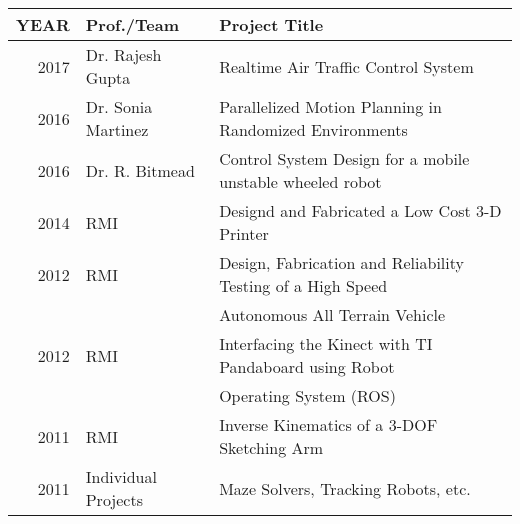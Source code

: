 \documentclass[]{deedy-resume-openfont}
\begin{document}
\begin{minipage}[t]{0.66\textwidth}
\begin{tabular}{rll}
YEAR	     & Prof./Team  & Project Title \\
\hline
2017	     & Dr. Rajesh Gupta & Realtime Air Traffic Control System \\ 
2016         & Dr. Sonia Martinez & Parallelized Motion Planning in Randomized Environments\\
2016         &Dr. R. Bitmead & Control System Design for a mobile unstable wheeled robot\\
2014	     & RMI  & Designd and Fabricated a Low Cost 3-D Printer\\
2012	     & RMI & Design, Fabrication and Reliability Testing of a High Speed \\& & Autonomous All Terrain Vehicle\\
2012	     & RMI & Interfacing the Kinect  with TI Pandaboard using Robot \\& & Operating System (ROS)\\
2011         & RMI & Inverse Kinematics of  a 3-DOF Sketching Arm \\
2011        &  Individual Projects & Maze Solvers, Tracking Robots, etc.\\
\end{tabular}
\sectionsep








\end{minipage} 
\end{document}
